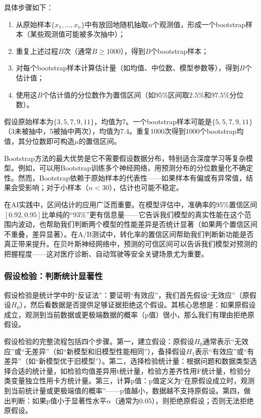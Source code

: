 具体步骤如下：
\begin{enumerate}
  \item 从原始样本$\{x_1, \ldots, x_n\}$中有放回地随机抽取$n$个观测值，形成一个bootstrap样本（某些观测值可能被多次抽中）；
  \item 重复上述过程$B$次（通常$B \geq 1000$），得到$B$个bootstrap样本；
  \item 对每个bootstrap样本计算估计量（如均值、中位数、模型参数等），得到$B$个估计值；
  \item 使用这$B$个估计值的分位数作为置信区间（如95\%区间取$2.5\%$和$97.5\%$分位数）。
\end{enumerate}

假设原始样本为$\{3, 5, 7, 9, 11\}$，均值为7。一个bootstrap样本可能是$\{5, 5, 7, 9, 11\}$（3未被抽中，5被抽中两次），均值为7.4。重复1000次得到1000个bootstrap均值，其分位数即可构造$\mu$的置信区间。

Bootstrap方法的最大优势是它不需要假设数据分布，特别适合深度学习等复杂模型。例如，可以用Bootstrap训练多个神经网络，用预测分布的分位数量化不确定性。然而，Bootstrap依赖于原始样本的代表性——如果样本有偏或有异常值，结果会受影响；对于小样本（$n < 30$），估计也可能不稳定。

在AI实践中，区间估计的应用广泛而重要。在模型评估中，准确率的95\%置信区间$[0.92, 0.95]$比单纯的``93\%''更有信息量——它告诉我们模型的真实性能在这个范围内波动，也帮助我们判断两个模型的性能差异是否统计显著（如果两个置信区间不重叠，差异显著）。在A/B测试中，转化率的置信区间帮助我们判断新功能是否真正带来提升。在贝叶斯神经网络中，预测的可信区间可以告诉我们模型对预测的把握程度——这对医疗诊断、自动驾驶等安全关键场景尤为重要。

\subsubsection{假设检验：判断统计显著性}

假设检验是统计学中的``反证法''：要证明``有效应''，我们首先假设``无效应''（原假设$H_0$），然后看数据是否提供足够证据拒绝这个假设。其核心思想是：如果原假设成立，观测到当前数据或更极端数据的概率（p值）很小，那么我们有理由拒绝原假设。

假设检验的完整流程包括四个步骤。第一，建立假设：原假设$H_0$通常表示``无效应''或``无差异''（如``新模型和旧模型性能相同''），备择假设$H_1$表示``有效应''或``有差异''（如``新模型优于旧模型''）。第二，选择检验统计量：根据问题和数据类型选择合适的统计量，如检验均值差异用t统计量，检验方差齐性用F统计量，检验分类变量独立性用卡方统计量。第三，计算p值：p值定义为``在原假设成立时，观测到当前统计量或更极端值的概率''——p值越小，数据越不支持原假设。第四，做出判断：如果p值小于显著性水平$\alpha$（通常为0.05），则拒绝原假设；否则无法拒绝原假设。

